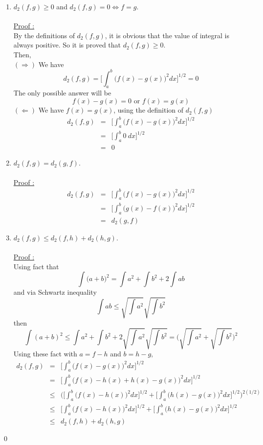 \documentclass[a4paper,10pt]{article}
\begin{document}
\begin{enumerate}
	\item $ d_{2}(f,g) \geq 0 $ and $ d_{2}(f,g)=0 \Leftrightarrow f=g $. \\ \\
	\underline{Proof : } \\
	By the definitions of $ d_{2}(f,g) $, it is obvious that the value of integral is always positive. So it is proved that $ d_{2}(f,g) \geq 0 $.\\
	Then, \\
	$ (\Rightarrow) $ We have 
	\[d_{2}(f,g)= \Big[ \int_{a}^{b} \big( f(x)-g(x) \big)^{2} dx  \Big]^{1/2} =0\]
	The only possible answer will be
	\[ f(x)-g(x) =0 \text{ or } f(x)=g(x) \]
	$ (\Leftarrow) $ We have $ f(x)=g(x) $, using the definition of $ d_{2}(f,g) $
	\begin{eqnarray}\nonumber
	d_{2}(f,g) &=& \Big[ \int_{a}^{b} \big( f(x)-g(x) \big)^{2} dx  \Big]^{1/2} \\ \nonumber
	&=& \Big[ \int_{a}^{b} 0 \ dx  \Big]^{1/2} \\ \nonumber
	&=& 0
	\end{eqnarray} 
	\item $ d_{2}(f,g) = d_{2}(g,f) $. \\ \\
	\underline{Proof : } \\
	\begin{eqnarray}\nonumber
	d_{2}(f,g) &=& \Big[ \int_{a}^{b} \big( f(x)-g(x) \big)^{2} dx  \Big]^{1/2} \\ \nonumber
	&=& \Big[ \int_{a}^{b} \big( g(x)-f(x) \big)^{2} dx  \Big]^{1/2} \\ \nonumber
	&=& d_{2}(g,f)
	\end{eqnarray}
	\item $ d_{2}(f,g) \leq d_{2}(f,h) + d_{2}(h,g) $. \\ \\
	\underline{Proof :} \\
	Using fact that
	\[\int\big(a+b\big)^2 = \int a^2 + \int b^2 + 2 \int ab \]
	and via Schwartz inequality
	\[ \int ab \leq \sqrt{\int a^2} \sqrt{\int b^2} \]
	then
	\[ \int (a+b)^2 \leq \int a^2 + \int b^2 + 2 \sqrt{\int a^2} \sqrt{\int b^2} = \Big(\sqrt{\int a^2} + \sqrt{\int b^2}\Big)^2 \]
	Using these fact with $ a=f-h $ and $ b=h-g $,
	\begin{eqnarray}\nonumber
	d_{2}(f,g) &=& \Big[ \int_{a}^{b} \big( f(x)-g(x) \big)^{2} dx  \Big]^{1/2} \\ \nonumber
	&=& \Big[ \int_{a}^{b} \big( f(x)-h(x)+h(x)-g(x) \big)^{2} dx  \Big]^{1/2} \\ \nonumber
	&\leq& \Big(\Big[ \int_{a}^{b} \big( f(x)-h(x) \big)^{2} dx  \Big]^{1/2} + \Big[ \int_{a}^{b} \big( h(x)-g(x) \big)^{2} dx  \Big]^{1/2}\Big)^{2(1/2)} \\ \nonumber
	&\leq&  \Big[ \int_{a}^{b} \big( f(x)-h(x) \big)^{2} dx  \Big]^{1/2} + \Big[ \int_{a}^{b} \big( h(x)-g(x) \big)^{2} dx \Big]^{1/2} \\ \nonumber
	&\leq& d_{2}(f,h) + d_{2}(h,g)
	\end{eqnarray}
\end{enumerate} \qed
\end{document}
